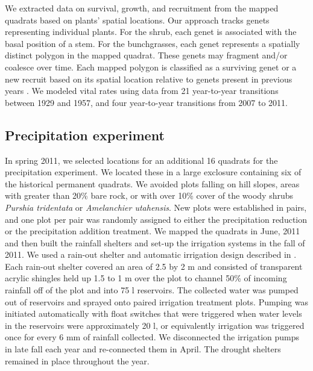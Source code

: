 \documentclass[11pt]{article}
\begin{document}
\begin{doublespace}
We extracted data on survival, growth, and recruitment from the mapped quadrats based on plants' spatial locations. Our approach tracks genets representing individual plants.  For the shrub, each genet is associated with the basal position of a stem.  For the bunchgrasses, each genet represents a spatially distinct polygon in the mapped quadrat. These genets may fragment and/or coalesce over time. Each mapped polygon is classified as a surviving genet or a new recruit based on its spatial location relative to genets present in previous years \citep{lauenroth_demography_2008}. We modeled vital rates using data from 21 year-to-year transitions between 1929 and 1957, and four year-to-year transitions from 2007 to 2011.  

\subsection*{Precipitation experiment}
In spring 2011, we selected locations for an additional 16 quadrats for the precipitation experiment. We located these in a large exclosure containing six of the historical permanent quadrats.  We avoided plots falling on hill slopes, areas with greater than 20\% bare rock, or with over 10\% cover of the woody shrubs \textit{Purshia tridentata} or \textit{Amelanchier utahensis}. New plots were established in pairs, and one plot per pair was randomly assigned to either the precipitation reduction or the precipitation addition treatment. We mapped the quadrats in June, 2011 and then built the rainfall shelters and set-up the irrigation systems in the fall of 2011. We used a rain-out shelter and automatic irrigation design described in \citep{gherardi_automated_2013}. Each rain-out shelter covered an area of 2.5 by 2 m and consisted of transparent acrylic shingles held up 1.5 to 1 m over the plot to channel 50\% of incoming rainfall off of the plot and into 75 l reservoirs. The collected water was pumped out of reservoirs and sprayed onto paired irrigation treatment plots. Pumping was initiated automatically with float switches that were triggered when water levels in the reservoirs were approximately 20 l, or equivalently irrigation was triggered once for every 6 mm of rainfall collected. We disconnected the irrigation pumps in late fall each year and re-connected them in April.  The drought shelters remained in place throughout the year.  


\end{doublespace}
\end{document}

